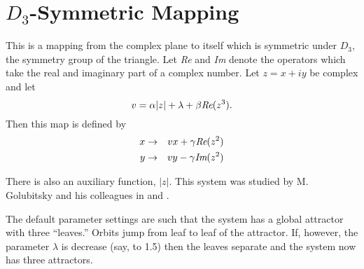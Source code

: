 \section{$D_3$-Symmetric Mapping}
This is a mapping from the complex plane to itself which is symmetric
under $D_3$, the symmetry group of the triangle.  Let {\it Re} and
{\it Im} denote the operators which take the real and imaginary part of a
complex number.  Let $z=x+iy$ be complex and let 
\[ v = \alpha |z| + \lambda + \beta \mbox{\it Re}(z^3).
\]
  Then this map is defined by
\begin{eqnarray*}
	x &\to& v x+\gamma \mbox{\it Re}(z^2) \\
	y &\to& v y-\gamma \mbox{\it Im}(z^2)
\end{eqnarray*}

There is also an auxiliary function, $|z|$.  This system was studied
by M. Golubitsky and his colleagues in \cite{golubitsky1} and \cite{golubitsky2}.

The default parameter settings are such that the system has a global
attractor with three ``leaves.''  Orbits jump from leaf to leaf of the
attractor.  If, however, the parameter $\lambda$ is decrease (say, to
1.5) then the leaves separate and the system now has three attractors.


